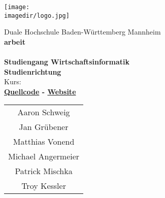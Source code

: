 \begin{titlepage}
	\begin{center}
		\texttt{[image: \\imagedir/logo.jpg]}	
	\end{center}
	\vspace{2em}
	\begin{center}
		{\textsf{\large Duale Hochschule Baden-W\"urttemberg Mannheim}}\\[4em]
		{\textsf{\textbf{\large{\DieArtDerArbeit}arbeit}}}\\[6mm]
		{\textsf{\textbf{\Large{}\DerTitelDerArbeit}}} \\[1.5cm]
		{\textsf{\textbf{\large{}Studiengang Wirtschaftsinformatik}}\\[6mm]
		\textsf{\textbf{Studienrichtung \DieStudienrichtung}}}\\[6mm]
		\textsf{Kurs: \DieKursbezeichnung} \\[1.5cm]

		\textbf{\href{https://github.com/DHBWMannheim/learninganalystics/}{Quellcode}
		-
		\href{https://dhbwlearning.web.app/}{Website}}


		\vspace{1.5cm}

		\begin{center}
			\begin{table}[h]
				\centering
				\begin{tabular}{c}
					Aaron Schweig \\
					Jan Grübener \\
					Matthias Vonend  \\
					Michael Angermeier \\
					Patrick Mischka \\
					Troy Kessler \\
				\end{tabular}
			\end{table}
		\end{center}

	\end{center}
\end{titlepage}